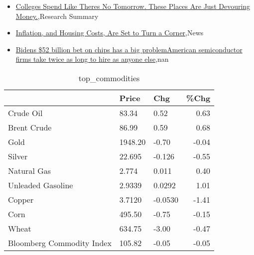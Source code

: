 \documentclass{article}%
\begin{document}
\begin{itemize}
\item%
\href{https://reddit.com/r/Economics/comments/15nh5tq/colleges\_spend\_like\_theres\_no\_tomorrow\_these/}{Colleges Spend Like Theres No Tomorrow. These Places Are Just Devouring Money.},Research Summary%
\item%
\href{https://reddit.com/r/Economics/comments/15nh1qs/inflation\_and\_housing\_costs\_are\_set\_to\_turn\_a/}{Inflation, and Housing Costs, Are Set to Turn a Corner},News%
\item%
\href{https://reddit.com/r/Economics/comments/15nglrp/bidens\_52\_billion\_bet\_on\_chips\_has\_a\_big/}{Bidens \$52 billion bet on chips has a big problemAmerican semiconductor firms take twice as long to hire as anyone else},nan%
\end{itemize}%


\begin{table}[htbp]%
\caption{top\_commodities}%
\centering%
\begin{adjustbox}{width=1\textwidth}%
\begin{tabular}{lllr}
\toprule
                          &   Price &     Chg &  \%Chg \\
\midrule
               Crude Oil  &   83.34 &    0.52 &  0.63 \\
             Brent Crude  &   86.99 &    0.59 &  0.68 \\
                    Gold  & 1948.20 &   -0.70 & -0.04 \\
                  Silver  &  22.695 &  -0.126 & -0.55 \\
             Natural Gas  &   2.774 &   0.011 &  0.40 \\
       Unleaded Gasoline  &  2.9339 &  0.0292 &  1.01 \\
                  Copper  &  3.7120 & -0.0530 & -1.41 \\
                    Corn  &  495.50 &   -0.75 & -0.15 \\
                   Wheat  &  634.75 &   -3.00 & -0.47 \\
Bloomberg Commodity Index &  105.82 &   -0.05 & -0.05 \\
\bottomrule
\end{tabular}
%
\end{adjustbox}%
\end{table}

%
\end{document}
